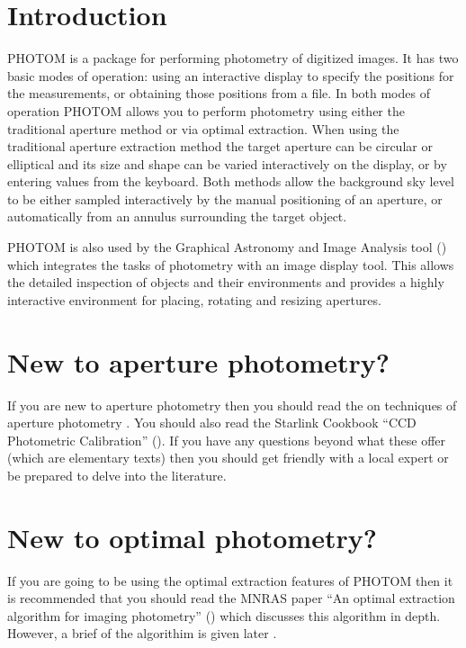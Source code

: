 \documentclass[twoside,11pt,nolof]{starlink}
\begin{document}
\scfrontmatter

\section{Introduction}

PHOTOM is a package for performing photometry of digitized images.
It has two basic modes of operation: using an interactive display
to specify the positions for the measurements, or obtaining those
positions from a file. In both modes of operation PHOTOM allows you
to perform photometry using either the traditional aperture method
or via optimal extraction. When using the traditional aperture extraction
method the target aperture can be circular or elliptical and its size
and shape can be varied interactively on the display, or by entering
values from the keyboard. Both methods allow the background sky level
to be either sampled interactively by the manual positioning of an
aperture, or automatically from an annulus surrounding the target object.

PHOTOM is also used by the Graphical Astronomy and Image Analysis tool
() which integrates the tasks of
photometry with an image display tool. This allows the
detailed inspection of objects and their environments and provides
a highly interactive environment for placing, rotating and resizing
apertures.

\section{New to aperture photometry?}

If you are new to aperture photometry then you should read the
 on techniques of aperture photometry
. You should also read the Starlink
Cookbook ``CCD Photometric Calibration'' (). If you
have any questions beyond what these offer (which are elementary
texts) then you should get friendly with a local expert or be prepared
to delve into the literature.

\section{New to optimal photometry?}

If you are going to be using the optimal extraction features of PHOTOM then
it is recommended that you should read the MNRAS paper ``An optimal extraction algorithm for imaging photometry'' () which discusses this algorithm in depth. However, a brief  of the algorithim is given later .
\end{document}
